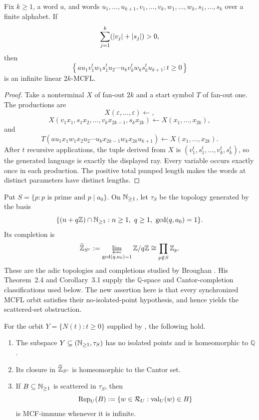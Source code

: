 \begin{lemma}
  \label{lem:synchronized-ray-linear-mcfg}
  Fix \(k\ge1\), a word \(a\), and words
  \(u_1,\ldots,u_{k+1},v_1,\ldots,v_k,w_1,\ldots,w_k,
  s_1,\ldots,s_k\) over a finite alphabet. If
  \[
    \sum_{j=1}^k(\lvert v_j \rvert+\lvert s_j \rvert)>0,
  \]
  then
  \[
    \left\{a u_1v_1^tw_1s_1^tu_2\cdots
      u_kv_k^tw_ks_k^tu_{k+1}:t\ge0\right\}
  \]
  is an infinite linear \(2k\)-MCFL.
\end{lemma}

\begin{proof}
  Take a nonterminal \(X\) of fan-out \(2k\) and a start symbol \(T\) of
  fan-out one. The productions are
  \[
    X(\varepsilon,\ldots,\varepsilon)\leftarrow,
  \]
  \[
    X(v_1x_1,s_1x_2,\ldots,v_kx_{2k-1},s_kx_{2k})
      \leftarrow X(x_1,\ldots,x_{2k}),
  \]
  and
  \[
    T(a u_1x_1w_1x_2u_2\cdots
      u_kx_{2k-1}w_kx_{2k}u_{k+1})
      \leftarrow X(x_1,\ldots,x_{2k}).
  \]
  After \(t\) recursive applications, the tuple derived from \(X\) is
  \((v_1^t,s_1^t,\ldots,v_k^t,s_k^t)\), so the generated language is
  exactly the displayed ray. Every variable occurs exactly once in each
  production. The positive total pumped length makes the words at
  distinct parameters have distinct lengths.
\end{proof}

Put \(S=\{p:p\text{ is prime and }p\mid a_0\}\). On
\(\mathbb{N}_{\ge1}\), let \(\tau_S\) be the topology generated by the basis
\[
  \{(n+q\ZZ)\cap\NN_{\ge1}:n\ge1,\ q\ge1,\ \gcd(q,a_0)=1\}.
\]
Its completion is
\[
  \widehat{\mathbb{Z}}_{S^c}
    :=\varprojlim_{\gcd(q,a_0)=1}\mathbb{Z}/q\mathbb{Z}
    \cong\prod_{p\notin S}\mathbb{Z}_p.
\]
These are the adic topologies and completions studied by Broughan
\cite{Broughan2003}. His Theorem~2.4 and Corollary~3.1 supply the
\(\mathbb Q\)-space and Cantor-completion classifications used below. The
new assertion here is that every synchronized MCFL orbit satisfies their
no-isolated-point hypothesis, and hence yields the scattered-set
obstruction.

\begin{theorem}
  \label{thm:mcfl-local-adic-fingerprint}
  For the orbit \(Y=\{N(t):t\ge0\}\) supplied by
  , the following hold.
  \begin{enumerate}[label=\textup{(\roman*)}]
    \item The subspace \(Y\subseteq(\mathbb{N}_{\ge1},\tau_S)\) has no isolated
    points and is homeomorphic to \(\mathbb Q\).
    \item Its closure in \(\widehat{\mathbb{Z}}_{S^c}\) is homeomorphic to the
    Cantor set.
    \item If \(B\subseteq\mathbb{N}_{\ge1}\) is scattered in \(\tau_S\), then
    \[
      \operatorname{Rep}_U(B)
        :=\{w\in\mathcal R_U:\operatorname{val}_U(w)\in B\}
    \]
    is MCF-immune whenever it is infinite.
  \end{enumerate}
\end{theorem}

